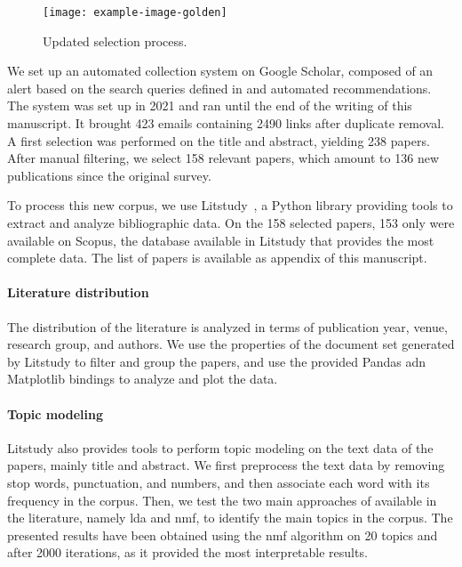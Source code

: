 \begin{figure}
\centering
  \texttt{[image: example-image-golden]}
  \caption{Updated selection process.}
  \label{fig:sota.methodo.update}
\end{figure}

We set up an automated collection system on Google Scholar, composed of an alert based on the search queries defined in  and automated recommendations.
The system was set up in 2021 and ran until the end of the writing of this manuscript. 
It brought 423 emails containing 2490 links after duplicate removal.
A first selection was performed on the title and abstract, yielding 238 papers.
After manual filtering, we select 158 relevant papers, which amount to 136 new publications since the original survey.

To process this new corpus, we use Litstudy~\cite{heldens_litstudyPythonpackage_2022}, a Python library providing tools to extract and analyze bibliographic data.
On the 158 selected papers, 153 only were available on Scopus, the database available in Litstudy that provides the most complete data.
The list of papers is available as appendix of this manuscript.

\paragraph{Literature distribution}

The distribution of the literature is analyzed in terms of publication year, venue, research group, and authors.
We use the properties of the document set generated by Litstudy to filter and group the papers, and use the provided Pandas adn Matplotlib bindings to analyze and plot the data.

\paragraph{Topic modeling}

Litstudy also provides tools to perform topic modeling on the text data of the papers, mainly title and abstract.
We first preprocess the text data by removing stop words, punctuation, and numbers, and then associate each word with its frequency in the corpus.
Then, we test the two main approaches of available in the literature, namely \gls{lda} and \gls{nmf}, to identify the main topics in the corpus.
The presented results have been obtained using the \gls{nmf} algorithm on 20 topics and after 2000 iterations, as it provided the most interpretable results.


